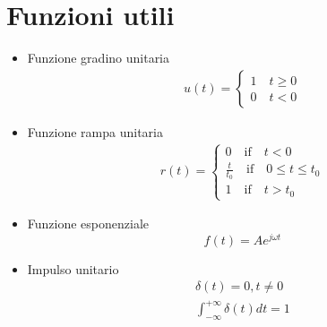 \documentclass[a4paper, titlepage, oneside]{scrbook}
\begin{document}
\section{Funzioni utili}
\begin{itemize}
	\item Funzione gradino unitaria
	\begin{align*}
	u(t)=\left\{
		\begin{array}{ll}
		1 \quad t\geq0\\
		0 \quad t<0
		\end{array}
		\right.
	\end{align*}
	
	\item Funzione rampa unitaria
	\begin{align*}
	r(t)=\left\{
	\begin{array}{ll}
	0  \quad \text{if} \quad t<0\\
	\frac{t}{t_{0}} \quad  \text{if} \quad 0\leq t\leq t_{0}\\
	1 \quad \text{if} \quad t>t_{0}
	\end{array}
	\right.
	\end{align*}
	
	\item Funzione esponenziale
	$$f(t)=Ae^{j\omega t}$$
	
	\item Impulso unitario
	\begin{align*}
	\delta(t)=0,t\neq0\\
	\int_{-\infty}^{+\infty}\delta(t)dt=1
	\end{align*}
\end{itemize}
\end{document}
